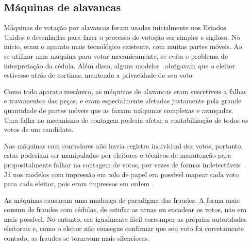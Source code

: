 \subsection{Máquinas de alavancas}

Máquinas de votação por alavancas foram usadas inicialmente nos Estados Unidos
e desenhadas para fazer o processo de votação ser simples e sigiloso. No
início, eram o aparato mais tecnológico existente, com muitas partes móveis. Ao
se utilizar uma máquina para votar mecanicamente, se evita o problema de
interpretação da cédula. Além disso, alguns
modelos~\nocite{gillespie1899voting} obrigavam que o eleitor estivesse atrás de
cortinas, mantendo a privacidade do seu voto.

Como todo aparato mecânico, as máquinas de alavancas eram suscetíveis a falhas
e travamentos das peças, e eram especialmente afetadas justamente pela grande
quantidade de partes móveis que as faziam máquinas complexas e avançadas. Uma
falha no mecanismo de contagem poderia afetar a contabilização de todos os
votos de um candidato.

Nas máquinas com contadores não havia registro
individual dos votos, portanto, estas poderiam ser manipuladas por eleitores e
técnicos de manutenção para propositalmente falhar na contagem de votos, por
vezes de formas indetectáveis~\cite[p.~42-45]{jones2012broken}. Já nos modelos
com impressão em rolo de papel era possível mapear cada voto para cada eleitor,
pois eram impressos em ordem~\cite[p.~26]{jones2012broken}.

As máquinas causaram uma mudança de paradigma das fraudes. A forma mais comum
de fraudes com cédulas, de estufar as urnas ou encadear os votos, não era mais
possível. No entanto, era igualmente fácil corromper as próprias autoridades
eleitorais e, como o eleitor não consegue confirmar que seu voto foi
corretamente contado, as fraudes se tornavam mais silenciosas.
